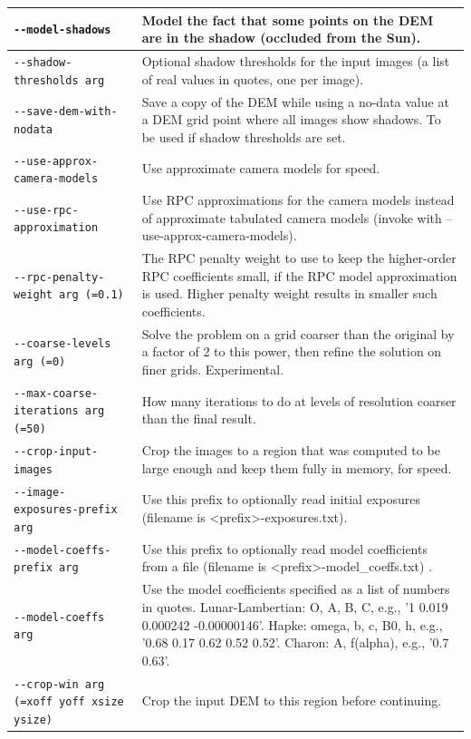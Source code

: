 \begin{longtable}{|l|p{7.5cm}|}
\texttt{-\/-model-shadows} & Model the fact that some points on the DEM are in the shadow (occluded from the Sun).\\ \hline
\texttt{-\/-shadow-thresholds arg} & Optional shadow thresholds for the input images (a list of real values in quotes, one per image).\\ \hline
\texttt{-\/-save-dem-with-nodata} & Save a copy of the DEM while using a no-data value at a DEM grid point where all images show shadows. To be used if shadow thresholds are set.\\ \hline
\texttt{-\/-use-approx-camera-models} & Use approximate camera models for speed.\\ \hline
\texttt{-\/-use-rpc-approximation} & Use RPC approximations for the camera models instead of approximate tabulated camera models (invoke with --use-approx-camera-models).\\ \hline
\texttt{-\/-rpc-penalty-weight arg (=0.1)} & The RPC penalty weight to use to keep the higher-order RPC coefficients small, if the RPC model approximation is used. Higher penalty weight results in smaller such coefficients.\\ \hline
\texttt{-\/-coarse-levels arg (=0)} & Solve the problem on a grid coarser than the original by a factor of 2 to this power, then refine the solution on finer grids. Experimental.\\ \hline
\texttt{-\/-max-coarse-iterations arg (=50)} & How many iterations to do at levels of resolution coarser than the final result.\\ \hline
\texttt{-\/-crop-input-images} & Crop the images to a region that was computed to be large enough and keep them fully in memory, for speed.\\ \hline
\texttt{-\/-image-exposures-prefix arg} & Use this prefix to optionally read initial exposures (filename is <prefix>-exposures.txt).\\ \hline
\texttt{-\/-model-coeffs-prefix arg} & Use this prefix to optionally read model coefficients from a file (filename is <prefix>-model\_coeffs.txt) .\\ \hline
\texttt{-\/-model-coeffs arg} & Use the model coefficients specified as a list of numbers in quotes. Lunar-Lambertian: O, A, B, C, e.g., '1 0.019 0.000242 -0.00000146'. Hapke: omega, b, c, B0, h, e.g., '0.68 0.17 0.62 0.52 0.52'. Charon: A, f(alpha), e.g., '0.7 0.63'.\\ \hline
\texttt{-\/-crop-win arg (=xoff yoff xsize ysize)} & Crop the input DEM to this region before continuing.\\ \hline

\end{longtable}
